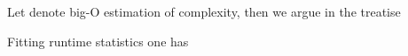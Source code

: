 {
\I Let  denote big-O estimation of complexity, then we argue in the treatise

\I Fitting runtime statistics one has
}


